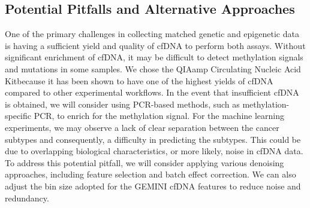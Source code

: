 \documentclass[11pt]{article}
\begin{document}
\subsection*{Potential Pitfalls and Alternative Approaches}
One of the primary challenges in collecting matched genetic and epigenetic data is having a sufficient yield and quality of cfDNA to perform both assays. 
Without significant enrichment of cfDNA, it may be difficult to detect methylation signals and mutations in some samples. 
We chose the QIAamp Circulating Nucleic Acid Kitbecause it has been shown to have one of the highest yields of cfDNA compared to other experimental workflows. 
In the event that insufficient cfDNA is obtained, we will consider using PCR-based methods, such as methylation-specific PCR, to enrich for the methylation signal.
For the machine learning experiments, we may observe a lack of clear separation between the cancer subtypes and consequently, a difficulty in predicting the subtypes. This could be due to overlapping biological characteristics, or more likely, noise in cfDNA data.
To address this potential pitfall, we will consider applying various denoising approaches, including feature selection and batch effect correction. We can also adjust the bin size adopted for the GEMINI cfDNA features to reduce noise and redundancy.
\newpage



\nocite{*}
\end{document}
